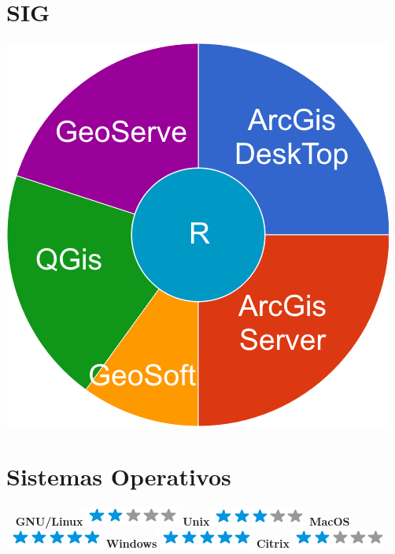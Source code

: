 \documentclass[]{friggeri-cv}
\begin{document}
\begin{aside}
  \section{SIG    }
    \includegraphics[scale=0.30]{img/Skill_SIG.png}
    ~
  \section{Sistemas Operativos}
  ~
    \textbf{GNU/Linux}\includegraphics[scale=0.40]{img/2stars.png}
    \textbf{Unix}\includegraphics[scale=0.40]{img/3stars.png}
    \textbf{MacOS}\includegraphics[scale=0.40]{img/5stars.png}
    \textbf{Windows}\includegraphics[scale=0.40]{img/5stars.png}
    \textbf{Citrix}\includegraphics[scale=0.40]{img/2stars.png}\textbf{}
    ~
\end{aside}
\end{document}
